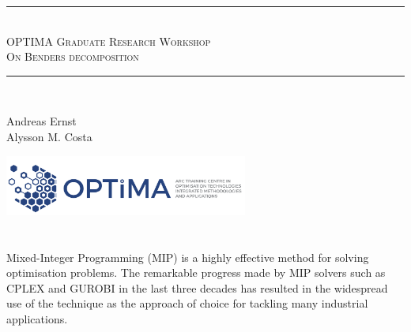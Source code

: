 
\usepackage{pgfplots}
\pgfplotsset{compat=1.16}
\usepackage{booktabs}








\begin{titlepage}

\begin{center}

\vfill

\rule{\linewidth}{0.5mm} \\[0.4cm]
\textsc{\Large OPTIMA Graduate Research Workshop \\[0.4cm] On  Benders decomposition }
\rule{\linewidth}{0.5mm} \\[1.5cm]

\end{center}

{\large 
\noindent Andreas Ernst\\[.3cm]
\noindent Alysson M. Costa\\
}

\vfill 

\includegraphics[width=8cm]{fig/optima.png}

\vspace{2cm}

\end{titlepage}


\section*{}

\vfill

Mixed-Integer Programming (MIP) is a highly effective method for solving optimisation problems. The remarkable progress made by MIP solvers such as CPLEX and GUROBI in the last three decades has resulted in the widespread use of the technique as the approach of choice for tackling many industrial applications.

